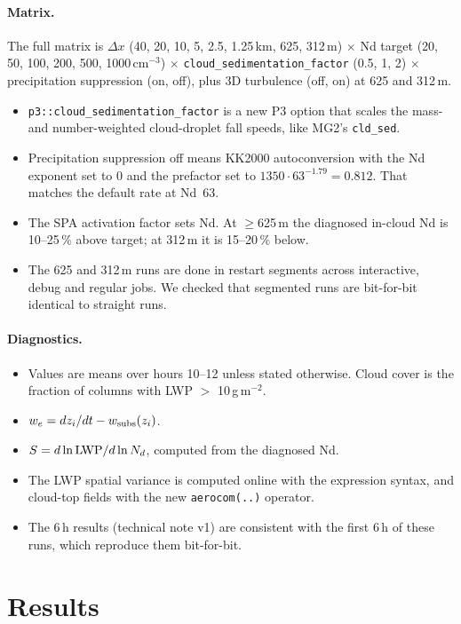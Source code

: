 \documentclass[10pt]{article}
\begin{document}
\paragraph{Matrix.} The full matrix is $\Delta x$ (40, 20, 10, 5, 2.5, 1.25\,km, 625, 312\,m) $\times$ Nd target (20, 50, 100, 200, 500, 1000\,cm$^{-3}$) $\times$
\texttt{cloud\_sedimentation\_factor} (0.5, 1, 2) $\times$ precipitation suppression (on, off), plus 3D turbulence (off, on) at 625 and 312\,m.
\begin{itemize}
\item \texttt{p3::cloud\_sedimentation\_factor} is a new P3 option that scales the mass- and number-weighted cloud-droplet fall speeds, like MG2's \texttt{cld\_sed}.
\item Precipitation suppression off means KK2000 autoconversion with the Nd exponent set to 0 and the prefactor set to $1350\cdot63^{-1.79}=0.812$. That matches the default rate at Nd~63.
\item The SPA activation factor sets Nd. At $\geq$625\,m the diagnosed in-cloud Nd is 10--25\,\% above target; at 312\,m it is 15--20\,\% below.
\item The 625 and 312\,m runs are done in restart segments across interactive, debug and regular jobs. We checked that segmented runs are bit-for-bit identical to straight runs.
\end{itemize}

\paragraph{Diagnostics.}
\begin{itemize}
\item Values are means over hours 10--12 unless stated otherwise. Cloud cover is the fraction of columns with LWP $>$ 10\,g\,m$^{-2}$.
\item $w_e = dz_i/dt - w_{\rm subs}(z_i)$.
\item $S = d\ln{\rm LWP}/d\ln N_d$, computed from the diagnosed Nd.
\item The LWP spatial variance is computed online with the expression syntax, and cloud-top fields with the new \texttt{aerocom(..)} operator.
\item The 6\,h results (technical note v1) are consistent with the first 6\,h of these runs, which reproduce them bit-for-bit.
\end{itemize}

\section{Results}
\end{document}
